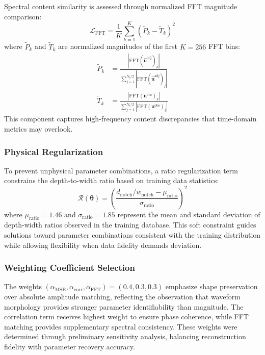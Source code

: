 \documentclass[12pt,a4paper]{report}
\begin{document}
Spectral content similarity is assessed through normalized FFT magnitude comparison:
\begin{equation}
\mathcal{L}_{\text{FFT}} = \frac{1}{K} \sum_{k=1}^{K} \left( \tilde{P}_k - \tilde{T}_k \right)^2
\label{eq:fft_loss}
\end{equation}
where $\tilde{P}_k$ and $\tilde{T}_k$ are normalized magnitudes of the first $K = 256$ FFT bins:
\begin{align}
\tilde{P}_k &= \frac{|\text{FFT}(\hat{\mathbf{u}}^{\text{adj}})_k|}{\sum_{j=1}^{N_t/2} |\text{FFT}(\hat{\mathbf{u}}^{\text{adj}})_j|} \\
\tilde{T}_k &= \frac{|\text{FFT}(\mathbf{u}^{\text{obs}})_k|}{\sum_{j=1}^{N_t/2} |\text{FFT}(\mathbf{u}^{\text{obs}})_j|}
\end{align}
This component captures high-frequency content discrepancies that time-domain metrics may overlook.

\subsubsection{Physical Regularization}
To prevent unphysical parameter combinations, a ratio regularization term constrains the depth-to-width ratio based on training data statistics:
\begin{equation}
\mathcal{R}(\boldsymbol{\theta}) = \left( \frac{d_{\text{notch}}/w_{\text{notch}} - \mu_{\text{ratio}}}{\sigma_{\text{ratio}}} \right)^2
\label{eq:ratio_regularization}
\end{equation}
where $\mu_{\text{ratio}} = 1.46$ and $\sigma_{\text{ratio}} = 1.85$ represent the mean and standard deviation of depth-width ratios observed in the training database. This soft constraint guides solutions toward parameter combinations consistent with the training distribution while allowing flexibility when data fidelity demands deviation.



\subsubsection{Weighting Coefficient Selection}
The weights $(\alpha_{\text{MSE}}, \alpha_{\text{corr}}, \alpha_{\text{FFT}}) = (0.4, 0.3, 0.3)$ emphasize shape preservation over absolute amplitude matching, reflecting the observation that waveform morphology provides stronger parameter identifiability than magnitude. The correlation term receives highest weight to ensure phase coherence, while FFT matching provides supplementary spectral consistency. These weights were determined through preliminary sensitivity analysis, balancing reconstruction fidelity with parameter recovery accuracy.
\end{document}
